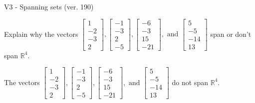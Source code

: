 \begin{exercise}
  \begin{exerciseTitle}V3 - Spanning sets (ver. 190)\end{exerciseTitle}
  \begin{exerciseStatement}
    Explain why the vectors \(\left[\begin{array}{r}
1 \\
-2 \\
-3 \\
2
\end{array}\right] , \left[\begin{array}{r}
-1 \\
-3 \\
2 \\
-5
\end{array}\right] , \left[\begin{array}{r}
-6 \\
-3 \\
15 \\
-21
\end{array}\right] , \text{ and } \left[\begin{array}{r}
5 \\
-5 \\
-14 \\
13
\end{array}\right]\) span or don't span \(\mathbb{R}^4\). 
	


  \end{exerciseStatement}
  \begin{exerciseAnswer}
   The vectors \(\left[\begin{array}{r}
1 \\
-2 \\
-3 \\
2
\end{array}\right] , \left[\begin{array}{r}
-1 \\
-3 \\
2 \\
-5
\end{array}\right] , \left[\begin{array}{r}
-6 \\
-3 \\
15 \\
-21
\end{array}\right] , \text{ and } \left[\begin{array}{r}
5 \\
-5 \\
-14 \\
13
\end{array}\right]\) 
  	 do not  
	span \(\mathbb{R}^4\).
  


  \end{exerciseAnswer}
\end{exercise}